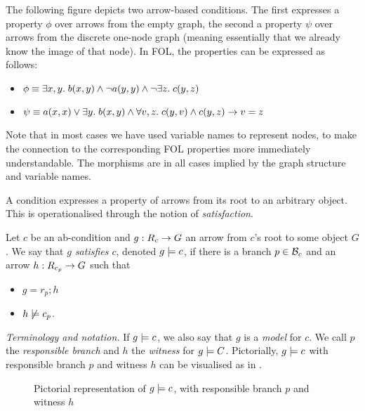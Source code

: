 \begin{example}
The following figure depicts two arrow-based conditions. The first expresses a property $\phi$ over arrows from the empty graph, the second a property $\psi$ over arrows from the discrete one-node graph (meaning essentially that we already know the image of that node). In FOL, the properties can be expressed as follows:
\begin{itemize}
\item $\phi\equiv \exists x,y.\; b(x,y) \wedge \neg a(y,y)\wedge \neg \exists z.\; c(y,z)$
\item $\psi\equiv a(x,x)\vee \exists y.\; b(x,y) \wedge \forall v,z.\; c(y,v)\wedge c(y,z) \rightarrow v=z$
\end{itemize}
Note that in most cases we have used variable names to represent nodes, to make the connection to the corresponding FOL properties more immediately understandable. The morphisms are in all cases implied by the graph structure and variable names.
\begin{center}

\end{center}
\end{example}
%
A condition expresses a property of arrows from its root to an arbitrary object. This is operationalised through the notion of \emph{satisfaction}.

\begin{definition}
  Let $c$ be an ab-condition and $g:R_c\rightarrow G$ an arrow from $c$'s root to some object $G$. We say that \emph{$g$ satisfies $c$}, denoted $g\models c$, if there is a branch $p\in \mathcal{B}_c$ and an arrow $h:R_{c_p}\rightarrow G$ such that
  \begin{itemize}
  \item $g=r_p;h$
  \item $h\not\models c_p$.
  \end{itemize}
\end{definition}
%
\emph{Terminology and notation.} If $g\models c$, we also say that $g$ is a \emph{model} for $c$. We call $p$ the \emph{responsible branch} and $h$ the \emph{witness} for $g\models C$. Pictorially, $g\models c$ with responsible branch $p$ and witness $h$ can be visualised as in .
%
\begin{figure}
  \centering
  
  \caption{Pictorial representation of $g\models c$, with responsible branch $p$ and witness $h$}
\end{figure}

